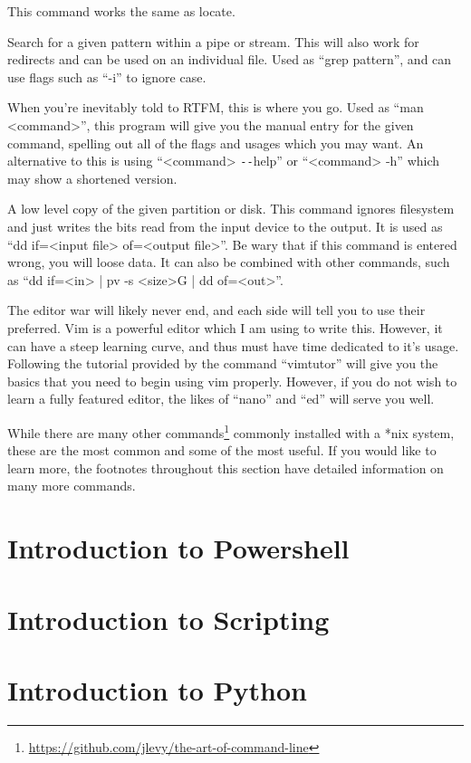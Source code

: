 \documentclass[a4paper,11pt]{report}
\begin{document}
\begin{description}
				This command works the same as locate. 
			\item[grep]
				Search for a given pattern within a pipe or stream. 
				This will also work for redirects and can be used on an individual file. 
				Used as ``grep pattern'', and can use flags such as ``-i'' to ignore case. 
			\item[man\footnote{\url{http://linux.die.net/man/}}]
				When you're inevitably told to RTFM, this is where you go. 
				Used as ``man <command>'', this program will give you the manual entry for the given command, spelling out all of the flags and usages which you may want. 
				An alternative to this is using ``<command> \verb+--+help'' or ``<command> -h'' which may show a shortened version. 
			\item[dd]
				A low level copy of the given partition or disk. 
				This command ignores filesystem and just writes the bits read from the input device to the output. 
				It is used as ``dd if=<input file> of=<output file>''.
				Be wary that if this command is entered wrong, you will loose data. 
				It can also be combined with other commands, such as ``dd if=<in> | pv -s <size>G | dd of=<out>''.
			\item[vim]
				The editor war will likely never end, and each side will tell you to use their preferred. 
				Vim is a powerful editor which I am using to write this. 
				However, it can have a steep learning curve, and thus must have time dedicated to it's usage. 
				Following the tutorial provided by the command ``vimtutor'' will give you the basics that you need to begin using vim properly. 
				However, if you do not wish to learn a fully featured editor, the likes of ``nano'' and ``ed'' will serve you well. 
		\end{description}
		While there are many other commands\footnote{\url{https://github.com/jlevy/the-art-of-command-line}} commonly installed with a \**nix system, these are the most common and some of the most useful. If you would like to learn more, the footnotes throughout this section have detailed information on many more commands. 

	\section{Introduction to Powershell}
	\section{Introduction to Scripting}
	\section{Introduction to Python}
\end{document}
